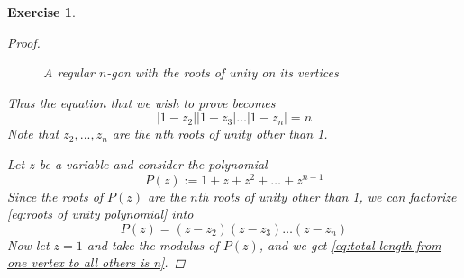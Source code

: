 \documentclass[11pt, oneside]{book}
\theoremstyle{break}
\newtheorem*{proof}{Proof}
\newtheorem{ex}{Exercise}[section]
\newcommand{\abs}[1]{\left|#1\right|}						%
\begin{document}
\begin{ex}
\begin{proof}
		\begin{figure}[H]
			\begin{center}
			\end{center}
			\caption[loftitle]{A regular $n$-gon with the roots of unity on its vertices}
			\label{figure:regular n-gon with roots of unity}
		\end{figure}

		Thus the equation that we wish to prove becomes
		\begin{equation}\label{eq:total length from one vertex to all others is n}
			\abs{1 - z_2}\abs{1 - z_3}\hdots\abs{1 - z_n} = n
		\end{equation}
		Note that $z_2, ..., z_n$ are the $n$th roots of unity other than 1.

		Let $z$ be a variable and consider the polynomial
		\begin{equation}\label{eq:roots of unity polynomial}
			P(z) := 1 + z + z^2 + \hdots + z^{n - 1}
		\end{equation}
		Since the roots of $P(z)$ are the $n$th roots of unity other than 1, we can factorize \cref{eq:roots of unity polynomial} into
		\begin{equation*}
			P(z) = (z - z_2)(z - z_3) \hdots (z - z_n)
		\end{equation*}
		Now let $z = 1$ and take the modulus of $P(z)$, and we get \cref{eq:total length from one vertex to all others is n}.
	\end{proof}
\end{ex}
\end{document}
